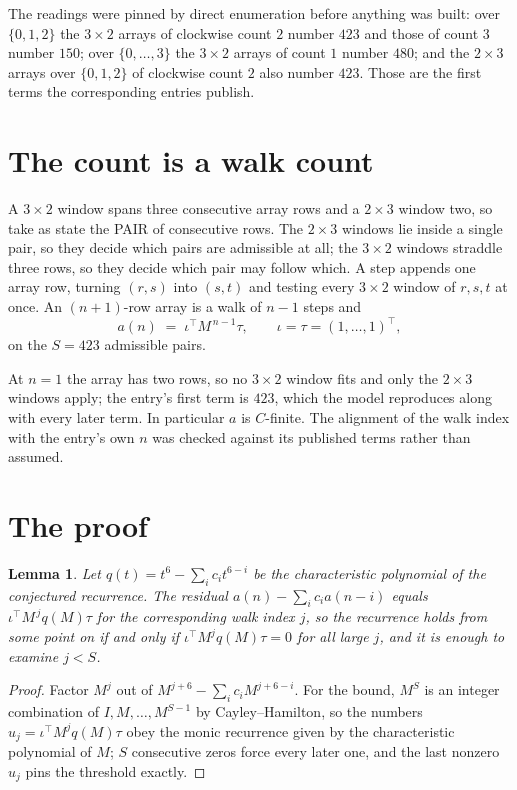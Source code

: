\documentclass[11pt,a4paper]{article}
\theoremstyle{plain}
\newtheorem{lemma}[theorem]{Lemma}
\theoremstyle{definition}
\begin{document}
The readings were pinned by direct enumeration before anything was built: over
$\{0,1,2\}$ the $3\times2$ arrays of clockwise count $2$ number $423$ and those of count
$3$ number $150$; over $\{0,\dots,3\}$ the $3\times2$ arrays of count $1$ number $480$;
and the $2\times3$ arrays over $\{0,1,2\}$ of clockwise count $2$ also number $423$. Those
are the first terms the corresponding entries publish.

\section{The count is a walk count}

A $3\times2$ window spans three consecutive array rows and a $2\times3$
window two, so take as state the PAIR of consecutive rows. The $2\times3$ windows lie inside a
single pair, so they decide which pairs are admissible at all; the $3\times2$ windows straddle
three rows, so they decide which pair may follow which. A step appends one array row, turning
$(r,s)$ into $(s,t)$ and testing every $3\times2$ window of $r,s,t$ at once. An $(n+1)$-row
array is a walk of $n-1$ steps and
\[
a(n)\;=\;\iota^{\!\top}M^{\,n-1}\tau,\qquad\iota=\tau=(1,\dots,1)^{\!\top},
\]
on the $S=423$ admissible pairs.

At $n=1$ the array has two rows, so no $3\times2$ window fits and only the
$2\times3$ windows apply; the entry's first term is
$423$, which the model reproduces along with every later term.
In particular $a$ is $C$-finite. The alignment of the walk index with the entry's own $n$ was
checked against its published terms rather than assumed.

\section{The proof}

\begin{lemma}\label{lem:crit}
Let $q(t)=t^{6}-\sum_i c_it^{6-i}$ be the characteristic polynomial of the
conjectured recurrence. The residual $a(n)-\sum_ic_ia(n-i)$ equals
$\iota^{\!\top}M^{\,j}q(M)\tau$ for the corresponding walk index $j$, so the recurrence
holds from some point on if and only if $\iota^{\!\top}M^{j}q(M)\tau=0$ for all large $j$,
and it is enough to examine $j<S$.
\end{lemma}

\begin{proof}
Factor $M^{j}$ out of $M^{j+6}-\sum_ic_iM^{j+6-i}$. For the bound, $M^{S}$
is an integer combination of $I,M,\dots,M^{S-1}$ by Cayley--Hamilton, so the numbers
$u_j=\iota^{\!\top}M^{j}q(M)\tau$ obey the monic recurrence given by the characteristic
polynomial of $M$; $S$ consecutive zeros force every later one, and the last nonzero $u_j$
pins the threshold exactly.
\end{proof}
\end{document}

